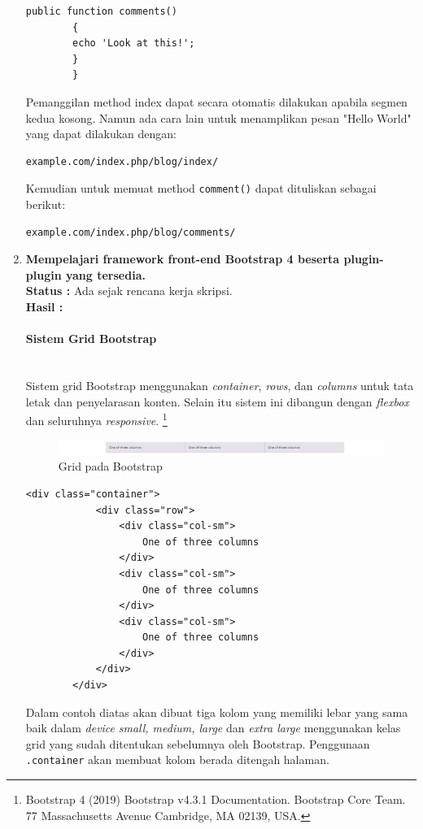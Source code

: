 \documentclass[a4paper,twoside]{article}
\newcommand{\myparagraph}[1]{\paragraph{#1}\mbox{}\\}
\begin{document}
\begin{enumerate}
\begin{lstlisting}[frame=single]
		public function comments()
		{
		echo 'Look at this!';
		}
		}
		\end{lstlisting}
		
		\noindent Pemanggilan method index dapat secara otomatis dilakukan apabila segmen kedua kosong. Namun ada cara lain untuk menamplikan pesan "Hello World" yang dapat dilakukan dengan:
		
		\begin{lstlisting}[frame=single] 
		example.com/index.php/blog/index/
		\end{lstlisting}
		
		\noindent Kemudian untuk memuat method \texttt{comment()} dapat dituliskan sebagai berikut:
		\begin{lstlisting}[frame=single] 
		example.com/index.php/blog/comments/
		\end{lstlisting}
		
		\item \textbf{Mempelajari framework front-end Bootstrap 4 beserta plugin-plugin yang tersedia.}\\
		{\bf Status :} Ada sejak rencana kerja skripsi.\\
		{\bf Hasil :} 
		
		\myparagraph{Sistem Grid Bootstrap}
		Sistem grid Bootstrap menggunakan \textit{container}, \textit{rows}, dan \textit{columns} untuk tata letak dan penyelarasan konten. Selain itu sistem ini dibangun dengan \textit{flexbox} dan seluruhnya \textit{responsive}. \footnote{Bootstrap 4 (2019) Bootstrap v4.3.1 Documentation. Bootstrap Core Team. 77 Massachusetts Avenue Cambridge, MA 02139, USA.}
		\begin{figure} [H]
			\centering  
			\includegraphics[scale=0.7]{gridbasic_bootstrap.png}  
			\caption{Grid pada Bootstrap} 
		\end{figure}
		
		\begin{lstlisting}[frame=single] 
		<div class="container">
			<div class="row">
				<div class="col-sm">
					One of three columns
				</div>
				<div class="col-sm">
					One of three columns
				</div>
				<div class="col-sm">
					One of three columns
				</div>
			</div>
		</div>
		\end{lstlisting}
		Dalam contoh diatas akan dibuat tiga kolom yang memiliki lebar yang sama baik dalam \textit{device} \textit{small, medium, large} dan \textit{extra large} menggunakan kelas grid yang sudah ditentukan sebelumnya oleh Bootstrap. Penggunaan \verb|.container| akan membuat kolom berada ditengah halaman.
		

\end{enumerate}
\end{document}
